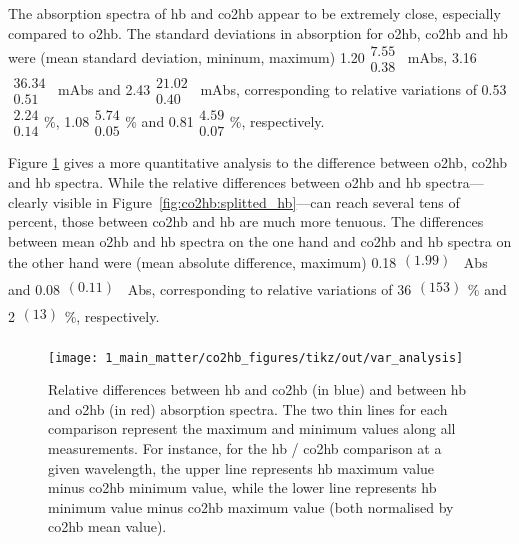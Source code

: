 The absorption spectra of \gls{hb} and \gls{co2hb} appear to be extremely close, especially compared to \mbox{\gls{o2hb}}. The standard deviations in absorption for \gls{o2hb}, \gls{co2hb} and \gls{hb} were (mean standard deviation, mininum, maximum) 1.20$\substack{7.55 \\ 0.38}$~mAbs, 3.16$\substack{36.34 \\ 0.51}$~mAbs and 2.43$\substack{21.02 \\ 0.40}$~mAbs, corresponding to relative variations of 0.53$\substack{2.24 \\ 0.14}$\%, 1.08$\substack{5.74 \\ 0.05}$\% and 0.81$\substack{4.59 \\ 0.07}$\%, respectively.

Figure \ref{fig:co2hb:var_analysis} gives a more quantitative analysis to the difference between \gls{o2hb}, \gls{co2hb} and \gls{hb} spectra. While the relative differences between \gls{o2hb} and \gls{hb} spectra---clearly visible in Figure~\ref{fig:co2hb:splitted_hb}---can reach several tens of percent, those between \gls{co2hb} and \gls{hb} are much more tenuous. The differences between mean \gls{o2hb} and \gls{hb} spectra on the one hand and \gls{co2hb} and \gls{hb} spectra on the other hand were (mean absolute difference, maximum) 0.18$\substack{(1.99) \\ {} }$~Abs and 0.08$\substack{(0.11) \\ {}}$~Abs, corresponding to relative variations of 36$\substack{(153) \\ {}}$\% and 2$\substack{(13) \\ {}}$\%, respectively.

\begin{figure}
	\centering
	\texttt{[image: 1\_main\_matter/co2hb\_figures/tikz/out/var\_analysis]}
	\caption[Relative differences between \gls{hb} / \gls{co2hb} and \gls{hb} / \gls{o2hb} absorption spectra.]{Relative differences between \gls{hb} and \gls{co2hb} (in blue) and between \gls{hb} and \gls{o2hb} (in red) absorption spectra. The two thin lines for each comparison represent the maximum and minimum values along all measurements. For instance, for the \gls{hb} / \gls{co2hb} comparison at a given wavelength, the upper line represents \gls{hb} maximum value minus \gls{co2hb} minimum value, while the lower line represents \gls{hb} minimum value minus \gls{co2hb} maximum value (both normalised by \gls{co2hb} mean value).}
	\label{fig:co2hb:var_analysis}
\end{figure}

